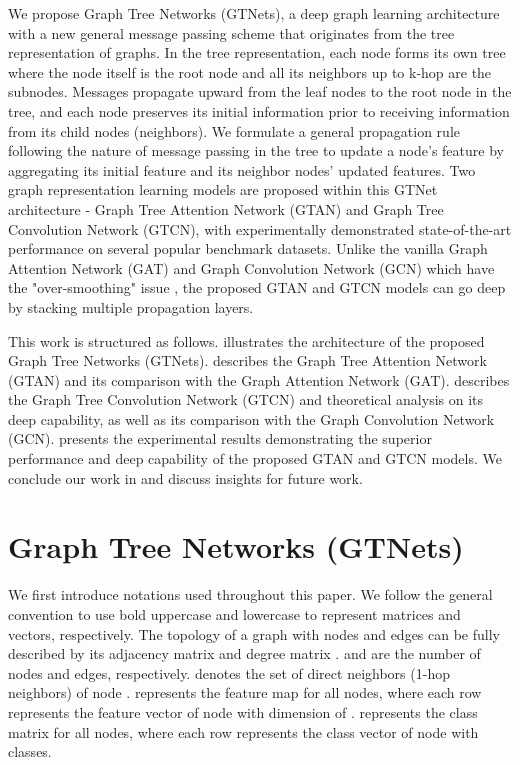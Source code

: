 \documentclass[lettersize,journal]{IEEEtran}
\theoremstyle{plain}
\theoremstyle{definition}
\theoremstyle{remark}
\begin{document}
We propose Graph Tree Networks (GTNets), a deep graph learning architecture with a new general message passing scheme that originates from the tree representation of graphs. In the tree representation, each node forms its own tree where the node itself is the root node and all its neighbors up to k-hop are the subnodes. Messages propagate upward from the leaf nodes to the root node in the tree, and each node preserves its initial information prior to receiving information from its child nodes (neighbors). We formulate a general propagation rule following the nature of message passing in the tree to update a node's feature by aggregating its initial feature and its neighbor nodes' updated features. Two graph representation learning models are proposed within this GTNet architecture - Graph Tree Attention Network (GTAN) and Graph Tree Convolution Network (GTCN), with experimentally demonstrated state-of-the-art performance on several popular benchmark datasets. Unlike the vanilla Graph Attention Network (GAT) and Graph Convolution Network (GCN) which have the "over-smoothing" issue \cite{xu2018representation, li2018deeper, chen2020measuring}, the proposed GTAN and GTCN models can go deep by stacking multiple propagation layers.

This work is structured as follows.  illustrates the architecture of the proposed Graph Tree Networks (GTNets).  describes the Graph Tree Attention Network (GTAN) and its comparison with the Graph Attention Network (GAT).  describes the Graph Tree Convolution Network (GTCN) and theoretical analysis on its deep capability, as well as its comparison with the Graph Convolution Network (GCN).  presents the experimental results demonstrating the superior performance and deep capability of the proposed GTAN and GTCN models. We conclude our work in  and discuss insights for future work.

\section{Graph Tree Networks (GTNets)}
\label{model}

We first introduce notations used throughout this paper. We follow the general convention to use bold uppercase and lowercase to represent matrices and vectors, respectively. The topology of a graph  with nodes  and edges  can be fully described by its adjacency matrix  and degree matrix .  and  are the number of nodes and edges, respectively.  denotes the set of direct neighbors (1-hop neighbors) of node .  represents the feature map for all nodes, where each row  represents the feature vector of node  with dimension of .  represents the class matrix for all nodes, where each row  represents the class vector of node  with  classes. 
\end{document}
